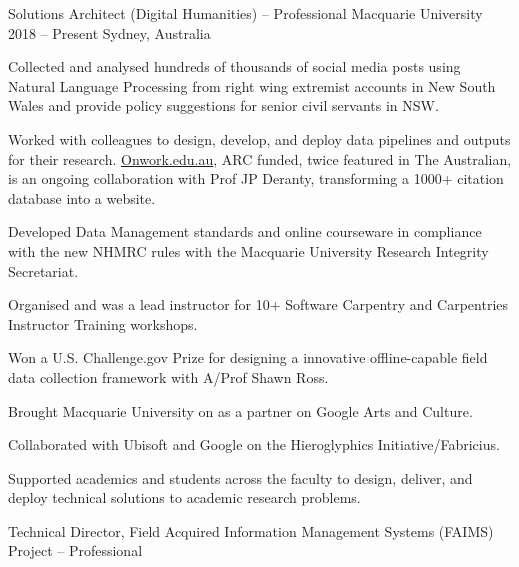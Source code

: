 

\begin{cventries}
\cventry
    {Solutions Architect (Digital Humanities) -- Professional} %
    {Macquarie University} %
    {2018 -- Present} %
    {Sydney, Australia} %
    {\begin{cvitems}%
    \item {Collected and analysed hundreds of thousands of social media posts using Natural Language Processing from right wing extremist accounts in New South Wales and provide policy suggestions for senior civil servants in NSW.}
    \item {Worked with colleagues to design, develop, and deploy data pipelines and outputs for their research. \href{https://onwork.edu.au}{Onwork.edu.au}, ARC funded, twice featured in The Australian, is an ongoing collaboration with Prof JP Deranty, transforming a 1000+ citation database into a website.}
    \item {Developed Data Management standards and online courseware in compliance with the new NHMRC rules with the Macquarie University Research Integrity Secretariat.}
    \item {Organised and was a lead instructor for 10+ Software Carpentry and Carpentries Instructor Training workshops.}
    \item {Won a U.S. Challenge.gov Prize for designing a innovative offline-capable field data collection framework with A/Prof Shawn Ross.}
    \item {Brought Macquarie University on as a partner on Google Arts and Culture.}
    \item {Collaborated with Ubisoft and Google on the Hieroglyphics Initiative/Fabricius.}
    \item {Supported academics and students across the faculty to design, deliver, and deploy technical solutions to academic research problems.}
    \end{cvitems}%
    }
    \cventry
    {Technical Director, Field Acquired Information Management Systems (FAIMS) Project -- Professional} %

\end{cventries}
